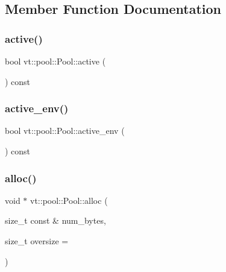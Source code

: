 \subsection{Member Function Documentation}
\mbox{\label{structvt_1_1pool_1_1_pool_a3f34112821d767815d5049dc83503033}} 
\subsubsection{\texorpdfstring{active()}{active()}}
{\footnotesize\ttfamily bool vt\+::pool\+::\+Pool\+::active (\begin{DoxyParamCaption}{ }\end{DoxyParamCaption}) const}

\mbox{\label{structvt_1_1pool_1_1_pool_aa11bdd76d9f6491ac412d5abc5c63274}} 
\subsubsection{\texorpdfstring{active\+\_\+env()}{active\_env()}}
{\footnotesize\ttfamily bool vt\+::pool\+::\+Pool\+::active\+\_\+env (\begin{DoxyParamCaption}{ }\end{DoxyParamCaption}) const}

\mbox{\label{structvt_1_1pool_1_1_pool_a0bf20e8b4ad1b85fb8952d81d433da55}} 
\subsubsection{\texorpdfstring{alloc()}{alloc()}}
{\footnotesize\ttfamily void $\ast$ vt\+::pool\+::\+Pool\+::alloc (\begin{DoxyParamCaption}\item[{size\+\_\+t const \&}]{num\+\_\+bytes,  }\item[{size\+\_\+t}]{oversize = {} }\end{DoxyParamCaption})}

